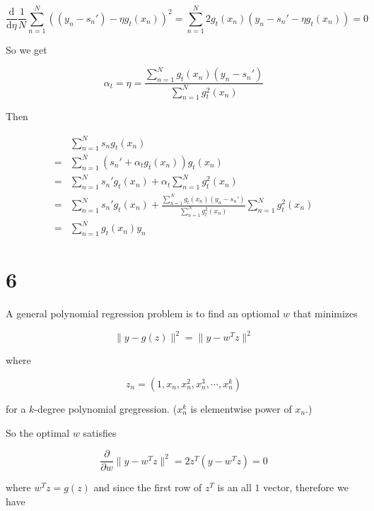 \documentclass[fleqn,a4paper,12pt]{article}
\begin{document}
\begin{equation*}
  \frac{\mathrm{d}}{\mathrm{d} \eta} \frac{1}{N} \sum_{n=1}^N ((y_n - s_n') - \eta g_t(x_n))^2 =
  \sum_{n=1}^N 2 g_t(x_n) (y_n - s_n' - \eta g_t(x_n)) = 0
\end{equation*}

So we get

\begin{equation*}
  \alpha_t = \eta = \frac{\sum_{n=1}^N g_t(x_n)(y_n - s_n')}{\sum_{n=1}^N g_t^2 (x_n)}
\end{equation*}

Then

\begin{align*}
   & \sum_{n=1}^N s_n g_t(x_n) \\
  =& \sum_{n=1}^N (s_n' + \alpha_t g_t(x_n)) g_t(x_n) \\
  =& \sum_{n=1}^N s_n' g_t(x_n) + \alpha_t \sum_{n=1}^N g_t^2(x_n) \\
  =& \sum_{n=1}^N s_n' g_t(x_n) + \frac{\sum_{n=1}^N g_t(x_n)(y_n - s_n')}{\sum_{n=1}^N g_t^2 (x_n)} \sum_{n=1}^N g_t^2(x_n) \\
  =& \sum_{n=1}^N g_t(x_n) y_n
\end{align*}

\section*{6}

A general polynomial regression problem is to find an optiomal $w$ that minimizes

\begin{equation*}
  \lVert y - g(z) \rVert^2 = \lVert y - w^T z \rVert^2
\end{equation*}

where

\begin{equation*}
z_n = (1, x_n, x_n^2, x_n^3, \cdots, x_n^k)
\end{equation*}

for a $k$-degree polynomial gregression. ($x_n^k$ is elementwise power of $x_n$.)

So the optimal $w$ satisfies

\begin{equation*}
  \frac{\partial}{\partial w} \lVert y - w^T z \rVert^2 = 2z^T(y - w^T z) = 0
\end{equation*}

where $w^Tz = g(z)$ and since the first row of $z^T$ is an all $1$ vector, therefore we have
\end{document}
